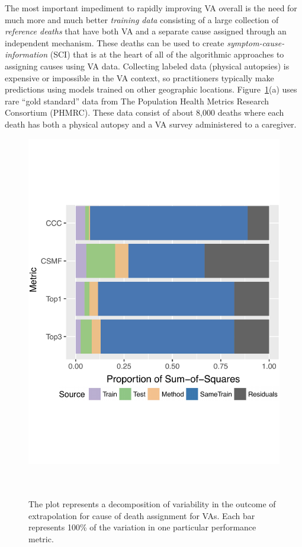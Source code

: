 \documentclass[12pt]{article}
\begin{document}
The most important impediment to rapidly improving VA overall is the need for much more and much better \textit{training data} consisting of a large collection of \textit{reference deaths} that have both VA and a separate cause assigned through an independent mechanism.  These deaths can be used to create \textit{symptom-cause-information} (SCI) that is at the heart of all of the algorithmic approaches to assigning causes using VA data. Collecting labeled data (physical autopsies) is expensive or impossible in the VA context, so practitioners typically make predictions using models trained on other geographic locations.  Figure~\ref{fig:vizpic}(a) uses rare ``gold standard'' data from The Population Health Metrics Research Consortium (PHMRC). These data consist of about 8,000 deaths where each death has both a physical autopsy and a VA survey administered to a caregiver.  
 \begin{figure}
   \begin{center}
      \includegraphics[width=.6\textwidth]{figures/vizpic.pdf}~\\~\\
         \caption{\label{fig:vizpic} The plot represents a decomposition of variability in the outcome of extrapolation for cause of death assignment for VAs.  Each bar represents 100\% of the variation in one particular performance metric.}
   \end{center}
\end{figure}
\end{document}
